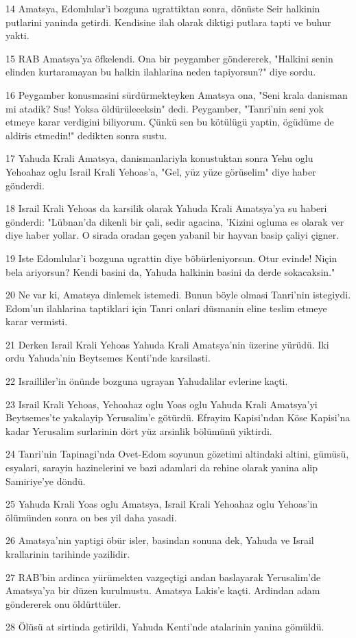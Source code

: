 \par 14 Amatsya, Edomlular'i bozguna ugrattiktan sonra, dönüste Seir halkinin putlarini yaninda getirdi. Kendisine ilah olarak diktigi putlara tapti ve buhur yakti.
\par 15 RAB Amatsya'ya öfkelendi. Ona bir peygamber göndererek, "Halkini senin elinden kurtaramayan bu halkin ilahlarina neden tapiyorsun?" diye sordu.
\par 16 Peygamber konusmasini sürdürmekteyken Amatsya ona, "Seni krala danisman mi atadik? Sus! Yoksa öldürüleceksin" dedi. Peygamber, "Tanri'nin seni yok etmeye karar verdigini biliyorum. Çünkü sen bu kötülügü yaptin, ögüdüme de aldiris etmedin!" dedikten sonra sustu.
\par 17 Yahuda Krali Amatsya, danismanlariyla konustuktan sonra Yehu oglu Yehoahaz oglu Israil Krali Yehoas'a, "Gel, yüz yüze görüselim" diye haber gönderdi.
\par 18 Israil Krali Yehoas da karsilik olarak Yahuda Krali Amatsya'ya su haberi gönderdi: "Lübnan'da dikenli bir çali, sedir agacina, 'Kizini ogluma es olarak ver diye haber yollar. O sirada oradan geçen yabanil bir hayvan basip çaliyi çigner.
\par 19 Iste Edomlular'i bozguna ugrattin diye böbürleniyorsun. Otur evinde! Niçin bela ariyorsun? Kendi basini da, Yahuda halkinin basini da derde sokacaksin."
\par 20 Ne var ki, Amatsya dinlemek istemedi. Bunun böyle olmasi Tanri'nin istegiydi. Edom'un ilahlarina taptiklari için Tanri onlari düsmanin eline teslim etmeye karar vermisti.
\par 21 Derken Israil Krali Yehoas Yahuda Krali Amatsya'nin üzerine yürüdü. Iki ordu Yahuda'nin Beytsemes Kenti'nde karsilasti.
\par 22 Israilliler'in önünde bozguna ugrayan Yahudalilar evlerine kaçti.
\par 23 Israil Krali Yehoas, Yehoahaz oglu Yoas oglu Yahuda Krali Amatsya'yi Beytsemes'te yakalayip Yerusalim'e götürdü. Efrayim Kapisi'ndan Köse Kapisi'na kadar Yerusalim surlarinin dört yüz arsinlik bölümünü yiktirdi.
\par 24 Tanri'nin Tapinagi'nda Ovet-Edom soyunun gözetimi altindaki altini, gümüsü, esyalari, sarayin hazinelerini ve bazi adamlari da rehine olarak yanina alip Samiriye'ye döndü.
\par 25 Yahuda Krali Yoas oglu Amatsya, Israil Krali Yehoahaz oglu Yehoas'in ölümünden sonra on bes yil daha yasadi.
\par 26 Amatsya'nin yaptigi öbür isler, basindan sonuna dek, Yahuda ve Israil krallarinin tarihinde yazilidir.
\par 27 RAB'bin ardinca yürümekten vazgeçtigi andan baslayarak Yerusalim'de Amatsya'ya bir düzen kurulmustu. Amatsya Lakis'e kaçti. Ardindan adam göndererek onu öldürttüler.
\par 28 Ölüsü at sirtinda getirildi, Yahuda Kenti'nde atalarinin yanina gömüldü.

